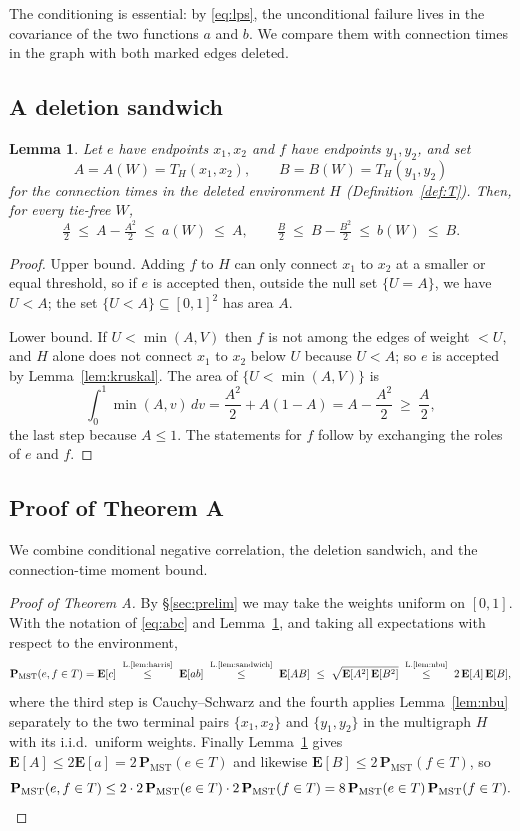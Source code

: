 \documentclass[11pt,a4paper]{amsart}
\theoremstyle{plain}
\newtheorem{lemma}[theorem]{Lemma}
\theoremstyle{definition}
\theoremstyle{remark}
\newcommand{\PMST}{\mathbf{P}_{\mathrm{MST}}}
\newcommand{\E}{\mathbf{E}}
\begin{document}
The conditioning is essential: by \eqref{eq:lps}, the unconditional failure
lives in the covariance of the two functions $a$ and $b$. We compare them with
connection times in the graph with both marked edges deleted.

\subsection{A deletion sandwich}
\label{sec:sandwich}

\begin{lemma}
\label{lem:sandwich}
Let $e$ have endpoints $x_1,x_2$ and $f$ have endpoints $y_1,y_2$, and set
\[
A=A(W)=T_H(x_1,x_2),\qquad B=B(W)=T_H(y_1,y_2)
\]
for the connection times in the deleted environment $H$
(Definition~\ref{def:T}). Then, for every tie-free $W$,
\[
\tfrac A2\ \le\ A-\tfrac{A^2}2\ \le\ a(W)\ \le\ A,
\qquad
\tfrac B2\ \le\ B-\tfrac{B^2}2\ \le\ b(W)\ \le\ B .
\]
\end{lemma}

\begin{proof}
Upper bound. Adding $f$ to $H$ can only connect $x_1$ to $x_2$ at a smaller or
equal threshold, so if $e$ is accepted then, outside the null set $\{U=A\}$, we
have $U<A$; the set $\{U<A\}\subseteq[0,1]^2$ has area $A$.

Lower bound. If $U<\min(A,V)$ then $f$ is not among the edges of weight $<U$, and
$H$ alone does not connect $x_1$ to $x_2$ below $U$ because $U<A$; so $e$ is
accepted by Lemma~\ref{lem:kruskal}. The area of $\{U<\min(A,V)\}$ is
\[
\int_0^1\min(A,v)\,dv=\frac{A^2}2+A(1-A)=A-\frac{A^2}2\ \ge\ \frac A2,
\]
the last step because $A\le1$. The statements for $f$ follow by exchanging the
roles of $e$ and $f$.
\end{proof}

\subsection{Proof of Theorem A}

We combine conditional negative correlation, the deletion sandwich, and the
connection-time moment bound.

\begin{proof}[Proof of Theorem A]
By \S\ref{sec:prelim} we may take the weights uniform on $[0,1]$. With the
notation of \eqref{eq:abc} and Lemma~\ref{lem:sandwich}, and taking all
expectations with respect to the environment,
\[
\PMST(e,f\in T)=\E[c]
\ \overset{\text{L.\ref{lem:harris}}}{\le}\ \E[ab]
\ \overset{\text{L.\ref{lem:sandwich}}}{\le}\ \E[AB]
\ \le\ \sqrt{\E[A^2]\,\E[B^2]}
\ \overset{\text{L.\ref{lem:nbu}}}{\le}\ 2\,\E[A]\,\E[B],
\]
where the third step is Cauchy--Schwarz and the fourth applies
Lemma~\ref{lem:nbu} separately to the two terminal pairs $\{x_1,x_2\}$ and
$\{y_1,y_2\}$ in the multigraph $H$ with its i.i.d.\ uniform weights. Finally
Lemma~\ref{lem:sandwich} gives
$\E[A]\le2\E[a]=2\,\PMST(e\in T)$ and likewise $\E[B]\le2\,\PMST(f\in T)$, so
\[
\PMST(e,f\in T)\le2\cdot2\,\PMST(e\in T)\cdot2\,\PMST(f\in T)
=8\,\PMST(e\in T)\,\PMST(f\in T).\qedhere
\]
\end{proof}
\end{document}
